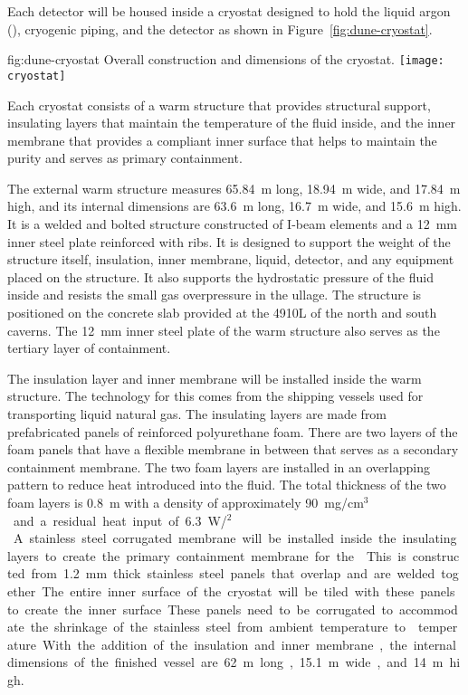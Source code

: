 Each detector will be housed inside a cryostat designed to hold the
liquid argon (), cryogenic piping, and the detector as shown in
Figure~\ref{fig:dune-cryostat}.
\begin{dunefigure}{fig:dune-cryostat}
  {Overall construction and dimensions of the  cryostat.}
  \texttt{[image: cryostat]}
\end{dunefigure}
Each cryostat consists of a warm structure that provides structural
support, insulating layers that maintain the temperature of the fluid
inside, and the inner membrane that provides a compliant inner surface
that helps to maintain the  purity and serves as primary
containment.

The external warm structure measures \SI{65.84}{\meter} long,
\SI{18.94}{\meter} wide, and \SI{17.84}{\meter} high, and its internal dimensions are 
\SI{63.6}{\meter} long, \SI{16.7}{\meter} wide, and \SI{15.6}{\meter}
high.  It is a welded and bolted structure constructed of
I-beam elements and a \SI{12}{\mm} inner steel plate reinforced with
ribs.  It is designed to support the
weight of the structure itself, 
insulation, inner membrane, liquid, detector, and any equipment placed
on the structure.  It also supports the hydrostatic pressure of the
fluid inside and resists the small gas overpressure in the ullage.
The structure is positioned on the concrete slab provided at the 4910L
of the north and south caverns.  The \SI{12}{\mm} inner steel plate of the
warm structure also serves as the tertiary layer of containment.

The insulation layer and inner membrane will be installed inside the
warm structure.  The technology for this comes from the shipping
vessels used for transporting liquid natural gas. The insulating
layers are made from prefabricated panels of reinforced polyurethane
foam.  There are two layers of the foam panels that have a flexible
membrane in between that serves as a secondary containment membrane.
The two foam layers are installed in an overlapping pattern to reduce
heat introduced into the fluid.  The total thickness of the two foam
layers is \SI{0.8}{\meter} with a density of approximately
\SI{90}{mg/cm$^3$} and a residual heat input of
\SI{6.3}{W/\meter$^2$}.  A stainless steel corrugated membrane will be
installed inside the insulating layers to create the primary
containment membrane for the .  This is constructed from \SI{1.2}{\mm}
thick stainless steel panels that overlap and are welded together.
The entire inner surface of the cryostat will be tiled with these
panels to create the inner surface.  These panels need to be
corrugated to accommodate the shrinkage of the stainless steel from
ambient temperature to  temperature.  With the addition of the
insulation and inner membrane, the internal dimensions of the finished
vessel are \SI{62}{\meter} long, \SI{15.1}{\meter} wide, and
\SI{14}{\meter} high.

